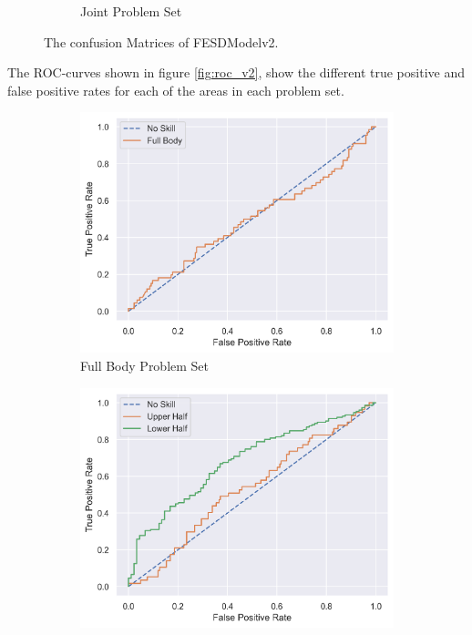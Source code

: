 \begin{figure}[htbp]
\begin{subfigure}[b]{0.4\linewidth}
      \caption{Joint Problem Set}
      \label{fig:jt_conf}
  \end{subfigure}
  \caption[Confusion Matrices of FESDModelv2]{The confusion Matrices of FESDModelv2.}
  \label{fig:conf_v2}
\end{figure}

The ROC-curves shown in figure \ref{fig:roc_v2}, show the different true positive and false positive rates for each of the areas in each problem set.

\begin{figure}[htbp]
  \centering
  \begin{subfigure}[b]{0.4\linewidth}
      \centering
      \includegraphics[width=\textwidth]{figures/Results/v2/roc/fb.png}
      \caption[]{Full Body Problem Set}
      \label{fig:fb_roc_v2}
  \end{subfigure}
  \hfill
  \begin{subfigure}[b]{0.4\linewidth}
      \centering
      \includegraphics[width=\textwidth]{figures/Results/v2/roc/hb.png}

\end{subfigure}
\end{figure}
